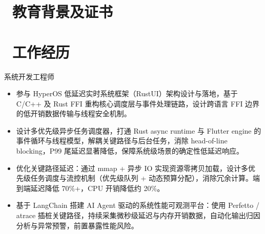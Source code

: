 \documentclass{resume}
\begin{document}


  
  \section{\faGraduationCap\  教育背景及证书}


  \section{\faUsers\ 工作经历}
  \begin{onehalfspacing}
  系统开发工程师
  \begin{itemize}
    \item 参与 HyperOS 低延迟实时系统框架（RustUI）架构设计与落地，基于 C/C++ 及 Rust FFI 重构核心调度层与事件处理链路，设计跨语言 FFI 边界的低开销数据传输与线程安全机制。
    \item 设计多优先级异步任务调度器，打通 Rust async runtime 与 Flutter engine 的事件循环与线程模型，解耦关键路径与后台任务，消除 head-of-line blocking，P99 尾延迟显著降低，保障系统级场景的确定性低延迟响应。
    \item 优化关键路径延迟：通过 mmap + 异步 IO 实现资源零拷贝加载，设计多优先级任务调度与流控机制（优先级队列 + 动态预算分配），消除冗余计算。端到端延迟降低 70\%+，CPU 开销降低约 20\%。
    \item 基于 LangChain 搭建 AI Agent 驱动的系统性能可观测平台：使用 Perfetto / atrace 插桩关键路径，持续采集微秒级延迟与内存开销数据，自动化输出归因分析与异常预警，前置暴露性能风险。
  \end{itemize}
  \end{onehalfspacing}
\end{document}
